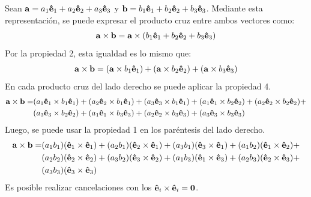 \documentclass[12pt]{article}
\begin{document}
Sean $\mathbf{a} = a_{1} \mathbf{\hat{e}}_{1} + a_{2} \mathbf{\hat{e}}_{2} + a_{3} \mathbf{\hat{e}}_{3}$ y $\mathbf{b} = b_{1} \mathbf{\hat{e}}_{1} + b_{2} \mathbf{\hat{e}}_{2} + b_{3} \mathbf{\hat{e}}_{3}$. Mediante esta representación, se puede expresar el producto cruz entre ambos vectores como:
\[
  \mathbf{a} \times \mathbf{b} = \mathbf{a} \times
                                 (b_{1} \mathbf{\hat{e}}_{1} + b_{2} \mathbf{\hat{e}}_{2} + b_{3} \mathbf{\hat{e}}_{3})
\]
Por la propiedad 2, esta igualdad es lo mismo que:
\[
  \mathbf{a} \times \mathbf{b} = (\mathbf{a} \times b_{1} \mathbf{\hat{e}}_{1}) + (\mathbf{a} \times b_{2} \mathbf{\hat{e}}_{2})
                                 + (\mathbf{a} \times b_{3} \mathbf{\hat{e}}_{3})
\]
En cada producto cruz del lado derecho se puede aplicar la propiedad 4.
\begin{align*}
  \mathbf{a} \times \mathbf{b} = &(a_{1} \mathbf{\hat{e}}_{1} \times b_{1} \mathbf{\hat{e}}_{1}) + (a_{2} \mathbf{\hat{e}}_{2} \times b_{1} \mathbf{\hat{e}}_{1}) +
                                 (a_{3} \mathbf{\hat{e}}_{3} \times b_{1} \mathbf{\hat{e}}_{1}) + (a_{1} \mathbf{\hat{e}}_{1} \times b_{2} \mathbf{\hat{e}}_{2}) +
                                 (a_{2} \mathbf{\hat{e}}_{2} \times b_{2} \mathbf{\hat{e}}_{2}) + \\
                                 &(a_{3} \mathbf{\hat{e}}_{3} \times b_{2} \mathbf{\hat{e}}_{2}) + (a_{1} \mathbf{\hat{e}}_{1} \times b_{3} \mathbf{\hat{e}}_{3}) +
                                 (a_{2} \mathbf{\hat{e}}_{2} \times b_{3} \mathbf{\hat{e}}_{3}) + (a_{3} \mathbf{\hat{e}}_{3} \times b_{3} \mathbf{\hat{e}}_{3})
\end{align*}
Luego, se puede usar la propiedad 1 en los paréntesis del lado derecho.
\begin{align*}
  \mathbf{a} \times \mathbf{b} = &(a_{1}b_{1}) (\mathbf{\hat{e}}_{1} \times \mathbf{\hat{e}}_{1}) + (a_{2}b_{1}) (\mathbf{\hat{e}}_{2} \times \mathbf{\hat{e}}_{1}) +
                                 (a_{3}b_{1}) (\mathbf{\hat{e}}_{3} \times \mathbf{\hat{e}}_{1}) + (a_{1}b_{2}) (\mathbf{\hat{e}}_{1} \times \mathbf{\hat{e}}_{2}) + \\
                                 &(a_{2}b_{2}) (\mathbf{\hat{e}}_{2} \times \mathbf{\hat{e}}_{2}) + (a_{3}b_{2}) (\mathbf{\hat{e}}_{3} \times \mathbf{\hat{e}}_{2}) +
                                 (a_{1}b_{3}) (\mathbf{\hat{e}}_{1} \times \mathbf{\hat{e}}_{3}) + (a_{2}b_{3}) (\mathbf{\hat{e}}_{2} \times \mathbf{\hat{e}}_{3}) + \\
                                 &(a_{3}b_{3}) (\mathbf{\hat{e}}_{3} \times \mathbf{\hat{e}}_{3})
\end{align*}
Es posible realizar cancelaciones con los $\mathbf{\hat{e}}_{i} \times \mathbf{\hat{e}}_{i} = \mathbf{0}$.
\end{document}
